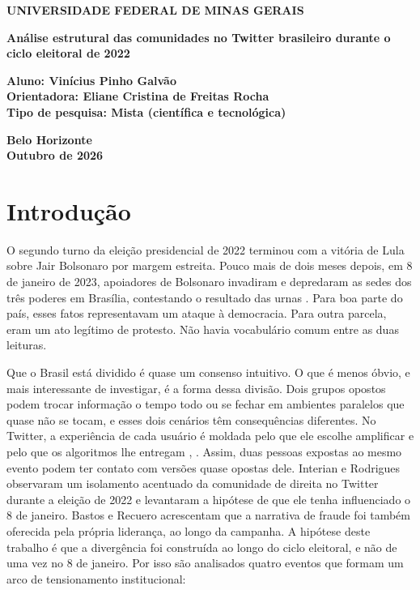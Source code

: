 \documentclass[12pt,a4paper,oneside]{article}
\begin{document}
\begin{titlepage}
  \centering
  \vspace*{1.5cm}
  {\bfseries UNIVERSIDADE FEDERAL DE MINAS GERAIS\par}
  \vspace{1.2cm}
  {\bfseries Análise estrutural das comunidades no Twitter brasileiro durante o ciclo eleitoral de 2022\par}
  \vfill
  {\bfseries
    Aluno: Vinícius Pinho Galvão\\
    Orientadora: Eliane Cristina de Freitas Rocha\\
    Tipo de pesquisa: Mista (científica e tecnológica)\par}
  \vspace{1.5cm}
  {\bfseries Belo Horizonte\\ Outubro de 2026\par}
  \vspace*{2.5cm}
\end{titlepage}

\section{Introdução}

O segundo turno da eleição presidencial de 2022 terminou com a vitória de Lula sobre Jair Bolsonaro por margem estreita. Pouco mais de dois meses depois, em 8 de janeiro de 2023, apoiadores de Bolsonaro invadiram e depredaram as sedes dos três poderes em Brasília, contestando o resultado das urnas \cite{bastos2023}. Para boa parte do país, esses fatos representavam um ataque à democracia. Para outra parcela, eram um ato legítimo de protesto. Não havia vocabulário comum entre as duas leituras.

Que o Brasil está dividido é quase um consenso intuitivo. O que é menos óbvio, e mais interessante de investigar, é a forma dessa divisão. Dois grupos opostos podem trocar informação o tempo todo ou se fechar em ambientes paralelos que quase não se tocam, e esses dois cenários têm consequências diferentes. No Twitter, a experiência de cada usuário é moldada pelo que ele escolhe amplificar e pelo que os algoritmos lhe entregam \cite{pariser2012}, \cite{sunstein2017}. Assim, duas pessoas expostas ao mesmo evento podem ter contato com versões quase opostas dele. Interian e Rodrigues \cite{interian2023} observaram um isolamento acentuado da comunidade de direita no Twitter durante a eleição de 2022 e levantaram a hipótese de que ele tenha influenciado o 8 de janeiro. Bastos e Recuero \cite{bastos2023} acrescentam que a narrativa de fraude foi também oferecida pela própria liderança, ao longo da campanha. A hipótese deste trabalho é que a divergência foi construída ao longo do ciclo eleitoral, e não de uma vez no 8 de janeiro. Por isso são analisados quatro eventos que formam um arco de tensionamento institucional:
\end{document}
